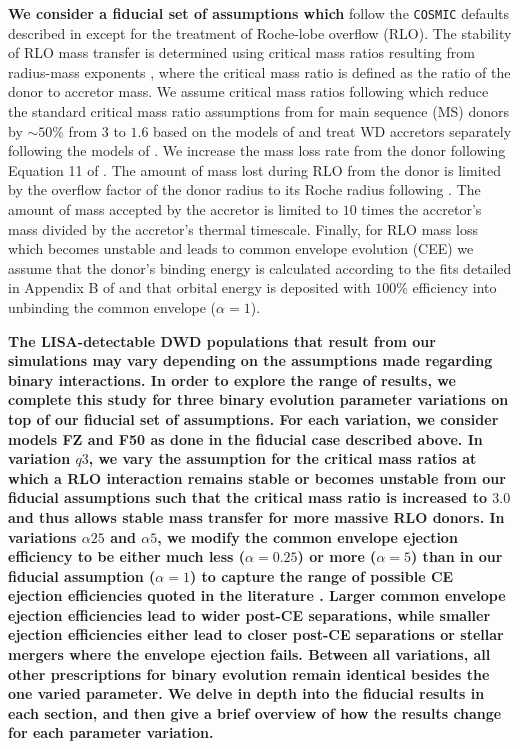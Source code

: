 \documentclass[twocolumn, linenumbers]{aastex631}
\begin{document}
\textbf{We consider a fiducial set of assumptions which} follow the \texttt{COSMIC} defaults described in \citet{Breivik2020a} except for the treatment of Roche-lobe overflow (RLO). The stability of RLO mass transfer is determined using critical mass ratios resulting from radius-mass exponents \citep{Webbink1985, Hurley2002}, where the critical mass ratio is defined as the ratio of the donor to accretor mass. We assume critical mass ratios following \citet{Claeys2014} which reduce the standard critical mass ratio assumptions from \citet{Hurley2002} for main sequence (MS) donors by $\sim50\%$ from $3$ to $1.6$ based on the models of \citet{deMink2007} and treat WD accretors separately following the models of \citet{Soberman1997}. We increase the mass loss rate from the donor following Equation 11 of \citet{Claeys2014}. The amount of mass lost during RLO from the donor is limited by the overflow factor of the donor radius to its Roche radius following \citet{Hurley2002}. The amount of mass accepted by the accretor is limited to $10$ times the accretor's mass divided by the accretor's thermal timescale. Finally, for RLO mass loss which becomes unstable and leads to common envelope evolution (CEE) we assume that the donor's binding energy is calculated according to the fits detailed in Appendix B of \citet{Claeys2014} and that orbital energy is deposited with $100\%$ efficiency into unbinding the common envelope ($\alpha=1$).

\textbf{The LISA-detectable DWD populations that result from our simulations may vary depending on the assumptions made regarding binary interactions. In order to explore the range of results, we complete this study for three binary evolution parameter variations on top of our fiducial set of assumptions. For each variation, we consider models FZ and F50 as done in the fiducial case described above. In variation $q3$, we vary the assumption for the critical mass ratios at which a RLO interaction remains stable or becomes unstable from our fiducial assumptions such that the critical mass ratio is increased to $3.0$ and thus allows stable mass transfer for more massive RLO donors. In variations $\alpha25$ and $\alpha5$, we modify the common envelope ejection efficiency to be either much less ($\alpha=0.25$) or more ($\alpha=5$) than in our fiducial assumption ($\alpha=1$) to capture the range of possible CE ejection efficiencies quoted in the literature  \citep[e.g.][]{Zorotovic2010, Fragos2019}. Larger common envelope ejection efficiencies lead to wider post-CE separations, while smaller ejection efficiencies either lead to closer post-CE separations or stellar mergers where the envelope ejection fails. Between all variations, all other prescriptions for binary evolution remain identical besides the one varied parameter. We delve in depth into the fiducial results in each section, and then give a brief overview of how the results change for each parameter variation.} 
\end{document}
